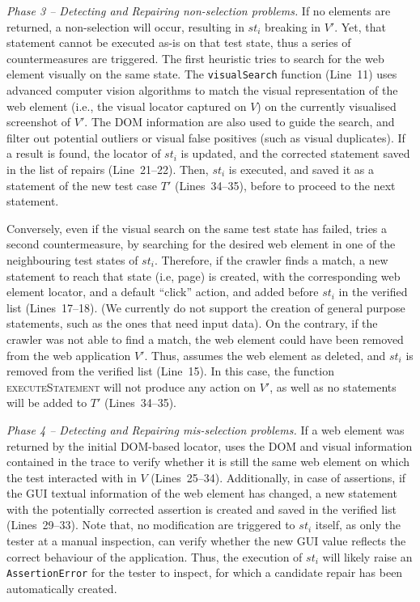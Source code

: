 \textit{Phase 3 -- Detecting and Repairing non-selection problems.}
If no elements are returned, a non-selection will occur, resulting in $st_i$ breaking in $V'$. Yet, that statement cannot be executed as-is on that test state, thus a series of countermeasures are triggered. The first heuristic tries to search for the web element visually on the same state. The \texttt{visualSearch} function (Line~11) uses advanced computer vision algorithms to match the visual representation of the web element (i.e., the visual locator captured on $V$) on the currently visualised screenshot of $V'$. The DOM information are also used to guide the search, and filter out potential outliers or visual false positives (such as visual duplicates). If a result is found, the locator of $st_i$ is updated, and the corrected statement saved in the list of repairs (Line~21--22). Then, $st_i$ is executed, and saved it as a statement of the new test case $T'$ (Lines~34--35), before to proceed to the next statement.

Conversely, even if the visual search on the same test state has failed, \tool tries a second countermeasure, by searching for the desired web element in one of the neighbouring test states of $st_i$.  Therefore, if the crawler finds a match, a new statement to reach that state (i.e, page) is created, with the corresponding web element locator, and a default ``click'' action, and added before $st_i$ in the verified list (Lines~17--18). (We currently do not support the creation of general purpose statements, such as the ones that need input data).
On the contrary, if the crawler was not able to find a match, the web element could have been removed from the web application $V'$. Thus, \tool assumes the web element as deleted, and $st_i$ is removed from the verified list (Line~15). In this case, the function \textsc{executeStatement} will not produce any action on $V'$, as well as no statements will be added to $T'$ (Lines~34--35).

\textit{Phase 4 -- Detecting and Repairing mis-selection problems.}
If a web element was returned by the initial DOM-based locator, \tool uses the DOM and visual information contained in the trace to verify whether it is still the same web element on which the test interacted with in $V$ (Lines~25--34). Additionally, in case of assertions, if the GUI textual information of the web element has changed, a new statement with the potentially corrected assertion is created and saved in the verified list (Lines~29--33). Note that, no modification are triggered to $st_i$ itself, as only the tester at a manual inspection, can verify whether the new GUI value reflects the correct behaviour of the application. Thus, the execution of $st_i$ will likely raise an \texttt{AssertionError} for the tester to inspect, for which a candidate repair has been automatically created.

